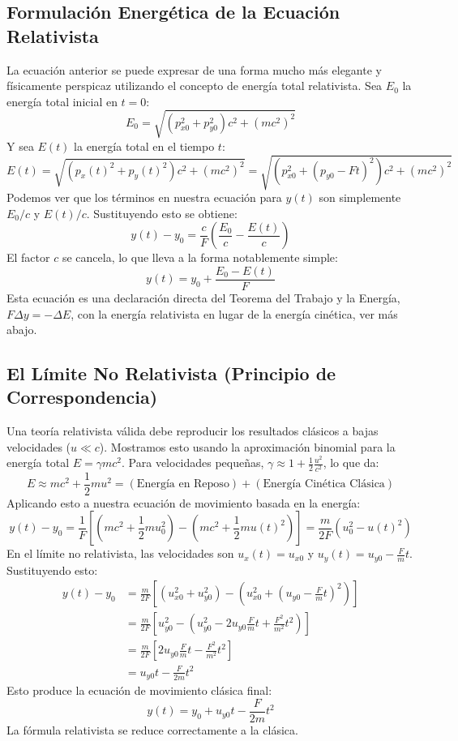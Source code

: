 \documentclass[11pt,a4paper]{article}
\begin{document}
\subsection{Formulación Energética de la Ecuación Relativista}
La ecuación anterior se puede expresar de una forma mucho más elegante y físicamente perspicaz utilizando el concepto de energía total relativista.
Sea $E_0$ la energía total inicial en $t=0$:
\[ E_0 = \sqrt{(p_{x0}^2 + p_{y0}^2)c^2 + (mc^2)^2} \]
Y sea $E(t)$ la energía total en el tiempo $t$:
\[ E(t) = \sqrt{(p_x(t)^2 + p_y(t)^2)c^2 + (mc^2)^2} = \sqrt{(p_{x0}^2 + (p_{y0}-Ft)^2)c^2 + (mc^2)^2} \]
Podemos ver que los términos en nuestra ecuación para $y(t)$ son simplemente $E_0/c$ y $E(t)/c$. Sustituyendo esto se obtiene:
\[ y(t) - y_0 = \frac{c}{F} \left( \frac{E_0}{c} - \frac{E(t)}{c} \right) \]
El factor $c$ se cancela, lo que lleva a la forma notablemente simple:
\[ \boxed{y(t) = y_0 + \frac{E_0 - E(t)}{F}} \]
Esta ecuación es una declaración directa del Teorema del Trabajo y la Energía, $F \Delta y = -\Delta E$, con la energía relativista en lugar de la energía cinética, ver más abajo.

\subsection{El Límite No Relativista (Principio de Correspondencia)}
Una teoría relativista válida debe reproducir los resultados clásicos a bajas velocidades ($u \ll c$). Mostramos esto usando la aproximación binomial para la energía total $E = \gamma mc^2$. Para velocidades pequeñas, $\gamma \approx 1 + \frac{1}{2}\frac{u^2}{c^2}$, lo que da:
\[ E \approx mc^2 + \frac{1}{2}mu^2 = (\text{Energía en Reposo}) + (\text{Energía Cinética Clásica}) \]
Aplicando esto a nuestra ecuación de movimiento basada en la energía:
\[ y(t) - y_0 = \frac{1}{F} \left[ \left(mc^2 + \frac{1}{2}mu_0^2\right) - \left(mc^2 + \frac{1}{2}mu(t)^2\right) \right] = \frac{m}{2F}(u_0^2 - u(t)^2) \]
En el límite no relativista, las velocidades son $u_x(t) = u_{x0}$ y $u_y(t) = u_{y0} - \frac{F}{m}t$. Sustituyendo esto:
\begin{align*}
y(t) - y_0 &= \frac{m}{2F} \left[ (u_{x0}^2 + u_{y0}^2) - \left(u_{x0}^2 + (u_{y0} - \frac{F}{m}t)^2\right) \right] \\
&= \frac{m}{2F} \left[ u_{y0}^2 - \left(u_{y0}^2 - 2u_{y0}\frac{F}{m}t + \frac{F^2}{m^2}t^2\right) \right] \\
&= \frac{m}{2F} \left[ 2u_{y0}\frac{F}{m}t - \frac{F^2}{m^2}t^2 \right] \\
&= u_{y0}t - \frac{F}{2m}t^2
\end{align*}
Esto produce la ecuación de movimiento clásica final:
\[ \boxed{y(t) = y_0 + u_{y0}t - \frac{F}{2m}t^2} \]
La fórmula relativista se reduce correctamente a la clásica.
\end{document}

